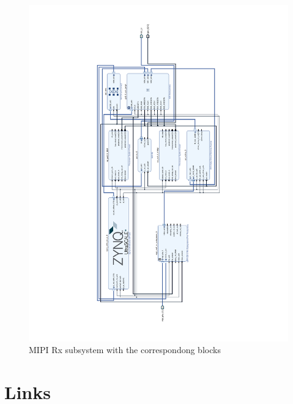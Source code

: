 \begin{figure}
    \centering
    \includegraphics[width=\linewidth]{assets/MIPI_1.pdf}
    \caption{MIPI Rx subsystem with the correspondong blocks}
    \label{fig:block_mipi}
\end{figure}

\chapter{Links}